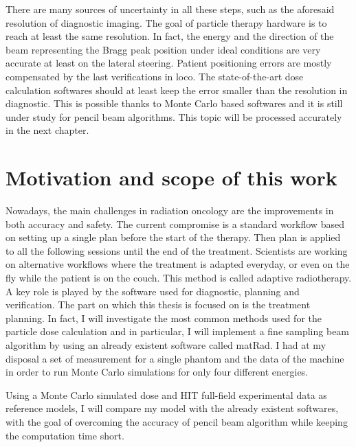 \documentclass[12pt, a4paper, twoside]{book}
\begin{document}
There are many sources of uncertainty in all these steps, such as the aforesaid resolution of diagnostic imaging. The goal of particle therapy hardware is to reach at least the same resolution. In fact, the energy and the direction of the beam representing the Bragg peak position under ideal conditions are very accurate at least on the lateral steering.
Patient positioning errors are mostly compensated by the last verifications in loco.
The state-of-the-art dose calculation softwares should at least keep the error smaller than the resolution in diagnostic. This is possible thanks to Monte Carlo based softwares and it is still under study for pencil beam algorithms. This topic will be processed accurately in the next chapter.



\section{Motivation and scope of this work} 
Nowadays, the main challenges in radiation oncology are the improvements in both accuracy and safety. 
The current compromise is a standard workflow based on setting up a single plan before the start of the therapy. Then plan is applied to all the following sessions until the end of the treatment.
Scientists are working on alternative workflows where the treatment is adapted everyday, or even on the fly while the patient is on the couch. This method is called adaptive radiotherapy.
A key role is played by the software used for diagnostic, planning and verification.
The part on which this thesis is focused on is the treatment planning. In fact, I will investigate the most common methods used for the particle dose calculation and in particular, I will implement a fine sampling beam algorithm by using an already existent software called matRad. 
I had at my disposal a set of measurement for a single phantom and the data of the machine in order to run Monte Carlo simulations for only four different energies.

Using a Monte Carlo simulated dose and HIT full-field experimental data as reference models, I will compare my model with the already existent softwares, with the goal of overcoming the accuracy of pencil beam algorithm while keeping the computation time short.  
\end{document}
